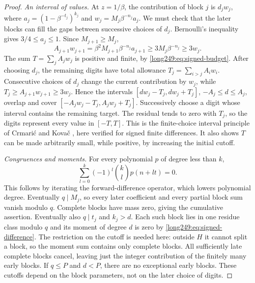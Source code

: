 \begin{proof}
\emph{An interval of values.} At $z=1/\beta$, the contribution of
block $j$ is $d_jw_j$, where
$a_j=(1-\beta^{-t_j})^{k_j}$ and $w_j=M_j\beta^{-n_j}a_j$.
We must check that the later blocks can fill the gaps between
successive choices of $d_j$.
Bernoulli's inequality gives $3/4\le a_j\le1$. Since $M_{j+1}\ge M_j$,
\[
 A_{j+1}w_{j+1}=\beta^2M_{j+1}\beta^{-n_j}a_{j+1}
 \ge3M_j\beta^{-n_j}\ge3w_j.
\]
The sum $T=\sum_j A_jw_j$ is positive and finite, by
\eqref{long249:eq:signed-budget}. After choosing $d_j$, the remaining
digits have total allowance $T_j=\sum_{i>j}A_iw_i$. Consecutive choices
of $d_j$ change the current contribution by $w_j$, while
$T_j\ge A_{j+1}w_{j+1}\ge3w_j$. Hence the intervals
$[dw_j-T_j,dw_j+T_j]$, $-A_j\le d\le A_j$, overlap and cover
$[-A_jw_j-T_j,A_jw_j+T_j]$. Successively choose a digit whose interval
contains the remaining target. The residual tends to zero with $T_j$,
so the digits represent every value in $[-T,T]$. This is the
finite-choice interval principle of Crmari\'{c} and Kova\v{c}
\cite[Lemma~4(a), Remark~5]{crmarickovac2025signed}, here verified for
signed finite differences. It also shows $T$ can be made arbitrarily
small, while positive, by increasing the initial cutoff.

\emph{Congruences and moments.} For every polynomial $p$ of degree less
than $k$,
\begin{equation}\label{long249:eq:signed-difference}
 \sum_{l=0}^k(-1)^l\binom kl p(n+lt)=0.
\end{equation}
This follows by iterating the forward-difference operator, which lowers
polynomial degree. Eventually $q\mid M_j$, so every later coefficient
and every partial block sum vanish modulo $q$. Complete blocks have
mass zero, giving the cumulative assertion. Eventually also $q\mid t_j$
and $k_j>d$. Each such block lies in one residue class modulo $q$ and
its moment of degree $d$ is zero by \eqref{long249:eq:signed-difference}.
The restriction on the cutoff is needed here: outside $H$ it cannot
split a block, so the moment sum contains only complete blocks.
All sufficiently late complete blocks cancel, leaving just the integer
contribution of the finitely many early blocks. If $q\le P$ and $d<P$, there are no
exceptional early blocks. These cutoffs depend on the block parameters,
not on the later choice of digits.


\end{proof}
